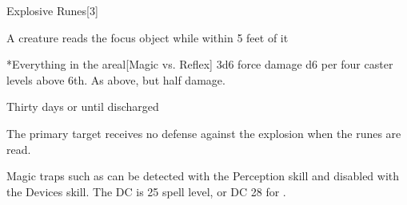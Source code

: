 \begin{spellsection}{Explosive Runes}[3]
    \begin{spellheader}
    \end{spellheader}
    \begin{spellcontent}
        \begin{spelltargetinginfo}
        \end{spelltargetinginfo}
        \begin{spelleffects}

            \spellline
            \begin{spelltrigger}{A creature reads the focus object while within 5 feet of it}
                \begin{spelltargets}*{Everything in the area}l[Magic vs. Reflex]
                    \spellsuccess 3d6 force damage \add d6 per four caster levels above 6th.
                    \spellfailure As above, but half damage.
                \end{spelltargets}
            \end{spelltrigger}
            \spelldur Thirty days or until discharged \dismissable
        \end{spelleffects}
    \end{spellcontent}
    \begin{spellfooter}
        \spellnotes The primary target receives no defense against the explosion when the runes are read.

        Magic traps such as  can be detected with the Perception skill and disabled with the Devices skill. The DC is 25 \add spell level, or DC 28 for .
    \end{spellfooter}
\end{spellsection}


